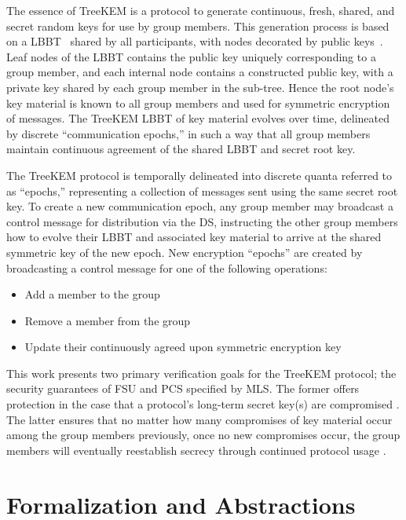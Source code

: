 \documentclass[runningheads]{llncs}
\newcommand{\Abrev}[1]{\gls{#1}}
\begin{document}
The essence of TreeKEM is a protocol to generate continuous, fresh, shared, and secret random keys for use by group members.
This generation process is based on a \Abrev{LBBT}~\cite{baerentzen2003left} shared by all participants, with nodes decorated by public keys~\cite{rfc4949}.
Leaf nodes of the \Abrev{LBBT} contains the public key uniquely corresponding to a group member, and each 
internal node contains a constructed public key, with a private key shared by each group member in the sub-tree.
Hence the root node's key material is known to all group members and used for symmetric encryption of messages.
The TreeKEM \Abrev{LBBT} of key material evolves over time, delineated by discrete ``communication epochs,'' in such a way that all group members maintain continuous agreement of the shared \Abrev{LBBT} and secret root key.

The TreeKEM protocol is temporally delineated into discrete quanta referred to as ``epochs,'' representing a collection of messages sent using the same secret root key.
To create a new communication epoch, any group member may broadcast a control message for distribution via the \Abrev{DS}, instructing the other group members how to evolve their \Abrev{LBBT} and associated key material to arrive at the shared symmetric key of the new epoch.
New encryption ``epochs'' are created by broadcasting a control message for one of the following operations:

\begin{itemize}
	\item Add a member to the group
	\item Remove a member from the group
	\item Update their continuously agreed upon symmetric encryption key
\end{itemize}

This work presents two primary verification goals for the TreeKEM protocol; the security guarantees of \Abrev{FSU} and  \Abrev{PCS} specified by \Abrev{MLS}.
The former offers protection in the case that a protocol's long-term secret key(s) are compromised \cite{boyd2021modern}.
The latter ensures that no matter how many compromises of key material occur among the group members previously, once no new compromises occur, the group members will eventually reestablish secrecy through continued protocol usage \cite{alwen2020security}.\\[-1mm]


\section{Formalization and Abstractions\label{sec:Formal-Abstractions}}
\end{document}
